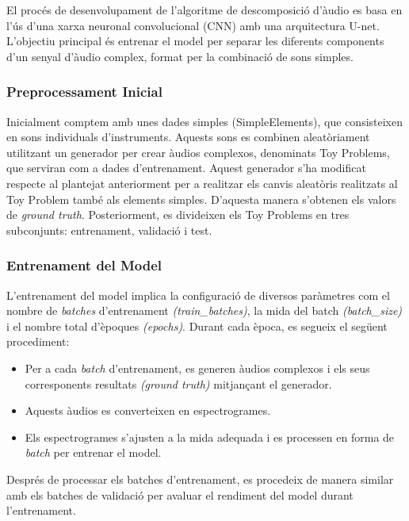\documentclass[10pt,a4paper,twocolumn,twoside]{article}
\begin{document}
El procés de desenvolupament de l'algoritme de descomposició d'àudio es basa en l'ús d'una xarxa neuronal convolucional (CNN) amb una arquitectura U-net. L'objectiu principal és entrenar el model per separar les diferents components d'un senyal d'àudio complex, format per la combinació de sons simples.

\subsubsection{Preprocessament Inicial}

Inicialment comptem amb unes dades simples (SimpleElements), que consisteixen en sons individuals d'instruments. Aquests sons es combinen aleatòriament utilitzant un generador per crear àudios complexos, denominats Toy Problems, que serviran com a dades d'entrenament. Aquest generador s'ha modificat respecte al plantejat anteriorment per a realitzar els canvis aleatòris realitzats al Toy Problem també als elements simples. D'aquesta manera s'obtenen els valors de \textit{ground truth}. Posteriorment, es divideixen els Toy Problems en tres subconjunts: entrenament, validació i test.

\subsubsection{Entrenament del Model}

L'entrenament del model implica la configuració de diversos paràmetres com el nombre de \textit{batches} d'entrenament \textit{(train\_batches)}, la mida del batch \textit{(batch\_size)} i el nombre total d'èpoques \textit{(epochs)}. Durant cada època, es segueix el següent procediment:

\begin{itemize}
    \item Per a cada \textit{batch} d'entrenament, es generen àudios complexos i els seus corresponents resultats \textit{(ground truth)} mitjançant el generador.
    \item Aquests àudios es converteixen en espectrogrames.
    \item Els espectrogrames s'ajusten a la mida adequada i es processen en forma de \textit{batch} per entrenar el model.
\end{itemize}

Després de processar els batches d'entrenament, es procedeix de manera similar amb els batches de validació per avaluar el rendiment del model durant l'entrenament.
\end{document}
